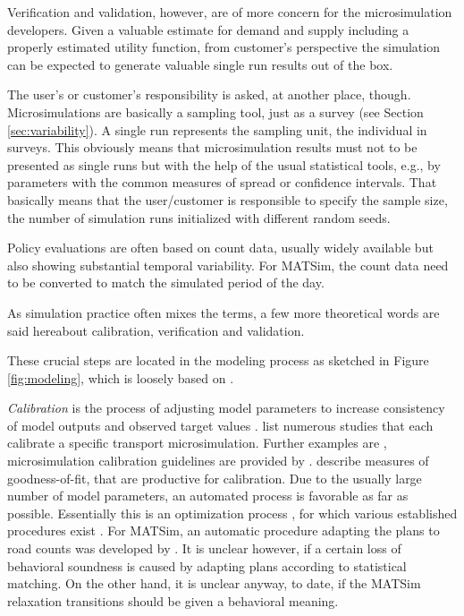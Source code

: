 Verification and validation, however, are of more concern for the microsimulation developers. Given a valuable estimate for demand and supply including a properly estimated utility function, from customer's perspective the simulation can be expected to generate valuable single run results out of the box.

The user's or customer's responsibility is asked, at another place, though. Microsimulations are basically a sampling tool, just as a survey (see Section \ref{sec:variability}). A single run represents the sampling unit, the individual in surveys. This obviously means that microsimulation results must not to be presented as single runs but with the help of the usual statistical tools, e.g., by parameters with the common measures of spread or confidence intervals. That basically means that the user/customer is responsible to specify the sample size, the number of simulation runs initialized with different random seeds. 

Policy evaluations are often based on count data, usually widely available but also showing substantial temporal variability. For MATSim, the count data need to be converted to match the simulated period of the day.

As simulation practice often mixes the terms, a few more theoretical words are said hereabout calibration, verification and validation. 

These crucial steps are located in the modeling process as sketched in Figure \ref{fig:modeling}, which is loosely based on \citet[][Figure 10.2]{Petty_SokolowskiBanks_2010}. 

\emph{Calibration} is the process of adjusting model parameters to increase consistency of model outputs and observed target values \citep[][p.348]{HollanderLiu_Transportation_2007} \citep[see also][]{TrucanoEtAl_RESS_2006}. \citet[][Table 1]{HollanderLiu_Transportation_2007} list numerous studies that each calibrate a specific transport microsimulation. Further examples are \citet[][]{SmithEtAl_JTE_2008, KimEtAl_TRR_2005, RutterEtAl_JASA_2009}, microsimulation calibration guidelines are provided by \citet[][]{MilamChao_TRBATPM_2001, WegmannEverett_TechRep_CTRUT_2008, DowlingEtAl_manual_2002}. \citet[][Table 2]{HollanderLiu_Transportation_2007} describe measures of goodness-of-fit, that are productive for calibration. Due to the usually large number of model parameters, an automated process is favorable as far as possible. Essentially this is an optimization process \citep[][p.353]{HollanderLiu_Transportation_2007}, for which various established procedures exist \citep[e.g.,][p.41ff]{ZhangMa_ResRep_PATH_2008}. For MATSim, an automatic procedure adapting the plans to road counts was developed by \citet[][]{FloetteroedEtAl_TechRep_TRANSPOR_2008}. It is unclear however, if a certain loss of behavioral soundness is caused by adapting plans according to statistical matching. On the other hand, it is unclear anyway, to date, if the MATSim relaxation transitions should be given a behavioral meaning.

